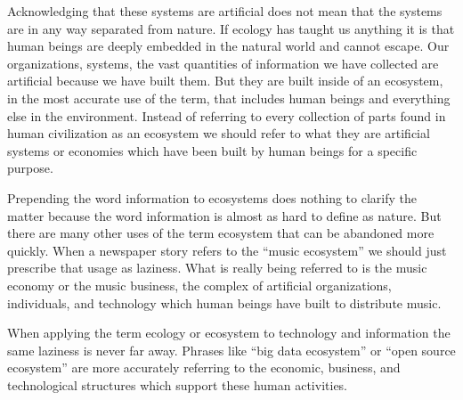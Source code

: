 Acknowledging that these systems are artificial does not mean that the systems are in any way separated from nature. If ecology has taught us anything it is that human beings are deeply embedded in the natural world and cannot escape. Our organizations, systems, the vast quantities of information we have collected are artificial because we have built them. But they are built inside of an ecosystem, in  the most accurate use of the term, that includes human beings and everything else in the environment. Instead of referring to every collection of parts found in human civilization as an ecosystem we should refer to what they are artificial systems or economies which have been built by human beings for a specific purpose.

Prepending the word information to ecosystems does nothing to clarify the matter because the word information is almost as hard to define as nature. But there are many other uses of the term ecosystem that can be abandoned more quickly. When a newspaper story refers to the “music ecosystem” we should just prescribe that usage as laziness. What is really being referred to is the music economy or the music business, the complex of artificial organizations, individuals, and technology which human beings have built to distribute music.

When applying the term ecology or ecosystem to technology and information the same laziness is never far away. Phrases like “big data ecosystem” or “open source ecosystem” are more accurately referring to the economic, business, and technological structures which support these human activities.